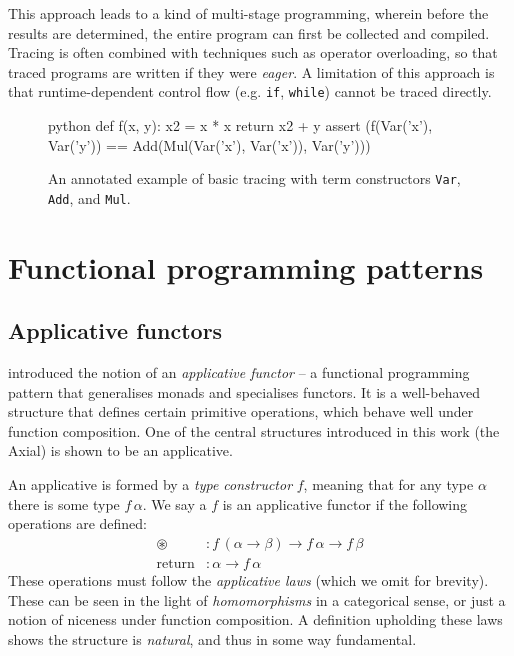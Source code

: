 This approach leads to a kind of multi-stage programming, wherein before the results are determined, the entire program can first be collected and compiled. Tracing is often combined with techniques such as operator overloading, so that traced programs are written if they were \textit{eager}. A limitation of this approach is that runtime-dependent control flow (e.g. \texttt{if}, \texttt{while}) cannot be traced directly.


\begin{figure}
    \centering
    \begin{cminted}{python}
def f(x, y):
    x2 = x * x
    return x2 + y
assert (f(Var('x'), Var('y')) 
        == Add(Mul(Var('x'), Var('x')), Var('y')))
    \end{cminted}
    \caption{An annotated example of basic tracing with term constructors \texttt{Var}, \texttt{Add}, and \texttt{Mul}.}
    \label{fig:tracing}
\end{figure}

\section{Functional programming patterns}
\label{functional-programming-patterns}

\subsection{Applicative functors}

\textcite{mcbride2008applicative} introduced the notion of an \textit{applicative functor} -- a functional programming pattern that generalises monads and specialises functors. It is a well-behaved structure that defines certain primitive operations, which behave well under function composition. One of the central structures introduced in this work (the Axial) is shown to be an applicative. 

An applicative is formed by a \textit{type constructor} $f$, meaning that for any type $\alpha$ there is some type $f\,\alpha$.
We say a $f$ is an applicative functor if the following operations are defined:
\begin{align*}
\circledast &: f\,(\alpha \to \beta) \to f\,\alpha \to f\,\beta \\
\mathrm{return} &: \alpha \to f\,\alpha
\end{align*}
These operations must follow the \textit{applicative laws} (which we omit for brevity). These can be seen in the light of \textit{homomorphisms} in a categorical sense, or just a notion of niceness under function composition. A definition upholding these laws shows the structure is \textit{natural}, and thus in some way fundamental.


